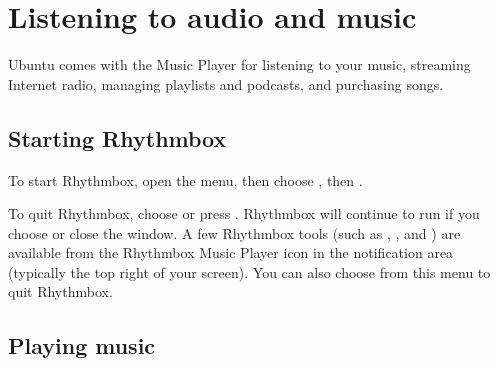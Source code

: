 
\begin{comment}

OUTLINE

[DONE] - Launch Rhythmbox (Ubuntu and UNE)
[DONE] - Play music
[DONE]   - Import and play audio files
[DONE]   - Use the toolbar
[DONE]   - Play from a CD and import
[DONE] - Listen to streaming radio
[DONE] - Connect with digital audio players
[DONE] - with other users (DAAP)
[DONE] - Manage podcasts
[DONE] - Preferences overview
[DONE] - Managing your music - playlists, ratings, deleting/moving songs from library
[DONE] - Plugins
[DONE] - Stores: Magnatune, Jamendo, Ubuntu One Music Store - give the basics and refer people to one.ubuntu.com/music and the store Help system for more info
[DONE] - Installing codecs
[DONE] - Where to get Rbox support

\end{comment}

\section{Listening to audio and music}
Ubuntu comes with the  Music Player for listening to your music, streaming Internet radio, managing playlists and podcasts, and purchasing songs.

\subsection{Starting Rhythmbox}
To start Rhythmbox, open the  menu, then choose , then .

To quit Rhythmbox, choose  or press . Rhythmbox will continue to run if you choose  or close the window. A few Rhythmbox tools (such as , , and ) are available from the Rhythmbox Music Player icon in the \gls{notification area} (typically the top right of your screen). You can also choose  from this menu to quit Rhythmbox.

\subsection{Playing music}



